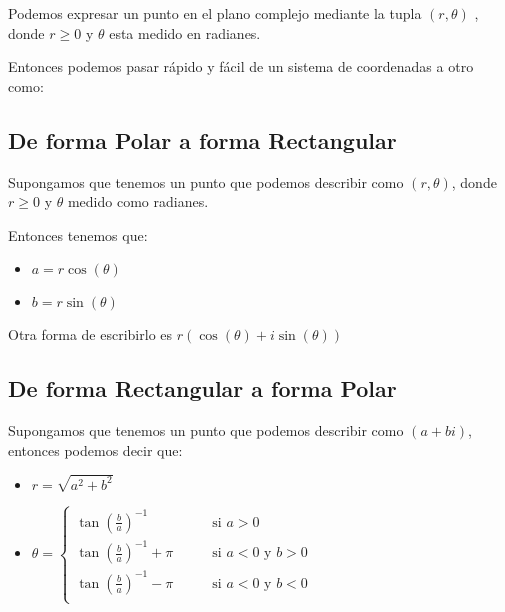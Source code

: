 \documentclass[12pt, fleqn]{report}                             %
\DeclareMathOperator \Space {\quad}                             %
\newcommand{\Wrap}[1]{\left( #1 \right)}                        %
\newcommand{\Cos}[1]{\cos\Wrap{#1}}
\newcommand{\Sin}[1]{\sin\Wrap{#1}}
\begin{document}
            Podemos expresar un punto en el plano complejo mediante la tupla $(r, \theta)$ , donde
            $r \geq 0$ y $\theta$ esta medido en radianes.

            Entonces podemos pasar rápido y fácil de un sistema de coordenadas a otro como:

            \subsection{De forma Polar a forma Rectangular}

                Supongamos que tenemos un punto que podemos describir como $(r, \theta)$,
                donde $r \geq 0$ y $\theta$ medido como radianes.

                Entonces tenemos que:

                \begin{itemize}
                     \item $a = r \Cos{\theta}$
                     \item $b = r \Sin{\theta}$
                 \end{itemize}

                 Otra forma de escribirlo es $r(\Cos{\theta} + i\Sin{\theta})$

            \subsection{De forma Rectangular a forma Polar}

                Supongamos que tenemos un punto que podemos describir como $(a+bi)$,
                entonces podemos decir que:

                \begin{itemize}
                    \item $r = \sqrt{a^2+b^2}$
                    \item $\theta = \begin{cases}
                                        \tan(\frac{b}{a})^{-1}      \Space &\text{ si } a > 0                   \\
                                        \tan(\frac{b}{a})^{-1} +\pi \Space &\text{ si } a < 0 \text{ y } b > 0  \\
                                        \tan(\frac{b}{a})^{-1} -\pi \Space &\text{ si } a < 0 \text{ y } b < 0  \\
                                    \end{cases}$
                \end{itemize}
\end{document}
